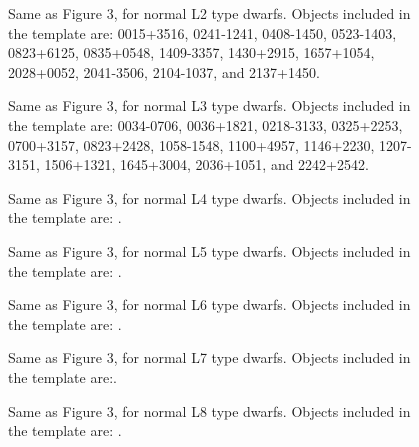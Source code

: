 \documentclass[12pt,preprint]{aastex}
\begin{document}
\begin{figure}
	\caption{Same as Figure 3, for normal L2 type dwarfs. Objects included in the template are: 0015+3516, 0241-1241, 0408-1450, 0523-1403, 0823+6125, 0835+0548, 1409-3357, 1430+2915, 1657+1054, 2028+0052, 2041-3506, 2104-1037, and 2137+1450.}
	\label{fig:L2field}
\end{figure}

\begin{figure}
	\caption{Same as Figure 3, for normal L3 type dwarfs. Objects included in the template are: 0034-0706, 0036+1821, 0218-3133, 0325+2253, 0700+3157, 0823+2428, 1058-1548, 1100+4957, 1146+2230, 1207-3151, 1506+1321, 1645+3004, 2036+1051, and 2242+2542.}
	\label{fig:L3field}
\end{figure}

\begin{figure}
	\caption{Same as Figure 3, for normal L4 type dwarfs. Objects included in the template are: .}
	\label{fig:L4field}
\end{figure}

\begin{figure}
	\caption{Same as Figure 3, for normal L5 type dwarfs. Objects included in the template are: .}
	\label{fig:L5field}
\end{figure}

\begin{figure}
	\caption{Same as Figure 3, for normal L6 type dwarfs. Objects included in the template are: .}
	\label{fig:L6field}
\end{figure}

\begin{figure}
	\caption{Same as Figure 3, for normal L7 type dwarfs. Objects included in the template are:.}
	\label{fig:L7field}
\end{figure}

\begin{figure}
	\caption{Same as Figure 3, for normal L8 type dwarfs. Objects included in the template are: .}
	\label{fig:L8field}
\end{figure}
\clearpage
\end{document}

